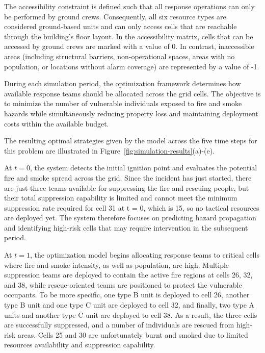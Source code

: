 The accessibility constraint is defined such that all response operations can only be performed by ground crews. Consequently, all six resource types are considered ground-based units and can only access cells that are reachable through the building's floor layout. In the accessibility matrix, cells that can be accessed by ground crews are marked with a value of 0. In contrast, inaccessible areas (including structural barriers, non-operational spaces, areas with no population, or locations without alarm coverage) are represented by a value of -1.

During each simulation period, the optimization framework determines how available response teams should be allocated across the grid cells. The objective is to minimize the number of vulnerable individuals exposed to fire and smoke hazards while simultaneously reducing property loss and maintaining deployment costs within the available budget.

The resulting optimal strategies given by the model across the five time steps for this problem are illustrated in Figure~\ref{fig:simulation-results}(a)-(e).


At $t = 0$, the system detects the initial ignition point and evaluates the potential fire and smoke spread across the grid. Since the incident has just started, there are just three teams available for suppressing the fire and rescuing people, but their total suppression capability is limited and cannot meet the minimum suppression rate required for cell 31 at t = 0, which is 15, so no tactical resources are deployed yet. The system therefore focuses on predicting hazard propagation and identifying high-risk cells that may require intervention in the subsequent period.

At $t = 1$, the optimization model begins allocating response teams to critical cells where fire and smoke intensity, as well as population, are high. Multiple suppression teams are deployed to contain the active fire regions at cells 26, 32, and 38, while rescue-oriented teams are positioned to protect the vulnerable occupants. To be more specific, one type B unit is deployed to cell 26, another type B unit and one type C unit are deployed to cell 32, and finally, two type A units and another type C unit are deployed to cell 38. As a result, the three cells are successfully suppressed, and a number of individuals are rescued from high-risk areas. Cells 25 and 30 are unfortunately burnt and smoked due to limited resources availability and suppression capability.


